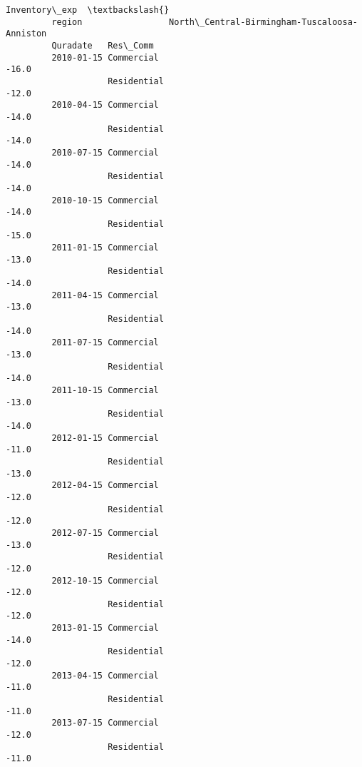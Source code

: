 \documentclass[11pt]{article}
\begin{document}
\begin{Verbatim}[commandchars=\\\{\}]
                                                               Inventory\_exp  \textbackslash{}
         region                 North\_Central-Birmingham-Tuscaloosa-Anniston   
         Quradate   Res\_Comm                                                   
         2010-01-15 Commercial                                         -16.0   
                    Residential                                        -12.0   
         2010-04-15 Commercial                                         -14.0   
                    Residential                                        -14.0   
         2010-07-15 Commercial                                         -14.0   
                    Residential                                        -14.0   
         2010-10-15 Commercial                                         -14.0   
                    Residential                                        -15.0   
         2011-01-15 Commercial                                         -13.0   
                    Residential                                        -14.0   
         2011-04-15 Commercial                                         -13.0   
                    Residential                                        -14.0   
         2011-07-15 Commercial                                         -13.0   
                    Residential                                        -14.0   
         2011-10-15 Commercial                                         -13.0   
                    Residential                                        -14.0   
         2012-01-15 Commercial                                         -11.0   
                    Residential                                        -13.0   
         2012-04-15 Commercial                                         -12.0   
                    Residential                                        -12.0   
         2012-07-15 Commercial                                         -13.0   
                    Residential                                        -12.0   
         2012-10-15 Commercial                                         -12.0   
                    Residential                                        -12.0   
         2013-01-15 Commercial                                         -14.0   
                    Residential                                        -12.0   
         2013-04-15 Commercial                                         -11.0   
                    Residential                                        -11.0   
         2013-07-15 Commercial                                         -12.0   
                    Residential                                        -11.0   

\end{Verbatim}
\end{document}
